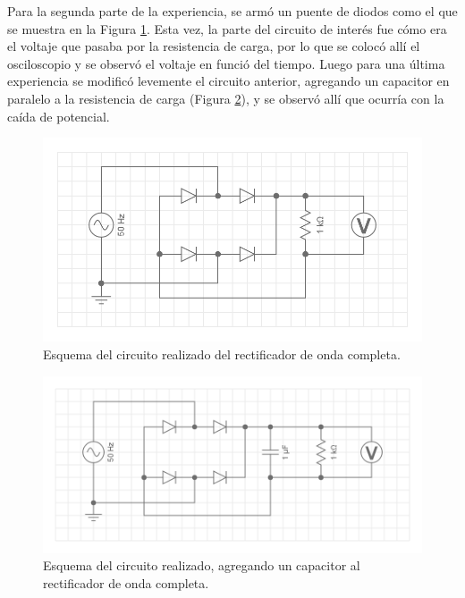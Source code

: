 \documentclass[twoside,twocolumn,a4paper]{article}
\begin{document}
Para la segunda parte de la experiencia, se arm\'o un puente de diodos como el que se muestra en la Figura \ref{fig:disp_exp2}. Esta vez, la parte del circuito de inter\'es fue c\'omo era el voltaje que pasaba por la resistencia de carga, por lo que se coloc\'o all\'i el osciloscopio y se observ\'o el voltaje en funci\'o del tiempo. Luego para una \'ultima experiencia se modific\'o levemente el circuito anterior, agregando un capacitor en paralelo a la resistencia de carga (Figura \ref{fig:disp_exp3}), y se observ\'o all\'i que ocurr\'ia con la ca\'ida de potencial. 

\begin{figure}[h]
\includegraphics[width=\linewidth]{disp_exp2.png}
\captionsetup{justification=centering}
\caption{Esquema del circuito realizado del rectificador de onda completa.}
\label{fig:disp_exp2}
\end{figure}

\begin{figure}[h!]
\includegraphics[width=\linewidth]{disp_exp3.png}
\captionsetup{justification=centering}
\caption{Esquema del circuito realizado, agregando un capacitor al rectificador de onda completa.}
\label{fig:disp_exp3}
\end{figure}
\end{document}
